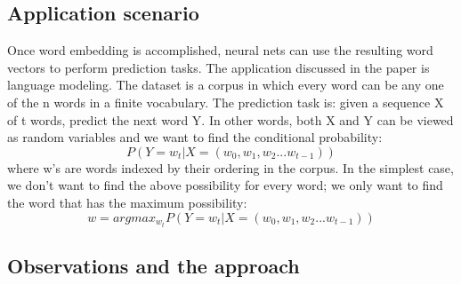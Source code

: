 \documentclass{article}
\begin{document}
\subsection{Application scenario}

Once word embedding is accomplished, neural nets can use the resulting word vectors to perform prediction tasks. The application discussed in the paper is language modeling. The dataset is a corpus in which every word can be any one of the n words in a finite vocabulary. The prediction task is: given a sequence X of t words, predict the next word Y. In other words, both X and Y can be viewed as random variables and we want to find the conditional probability:
\begin{equation}
P(Y = w_t|X = (w_0, w_1, w_2 ... w_{t-1}))
\end{equation}
where w's are words indexed by their ordering in the corpus. In the simplest case, we don't want to find the above possibility for every word; we only want to find the word that has the maximum possibility:
\begin{equation}
	w = argmax_{w_t}P(Y = w_t|X = (w_0, w_1, w_2 ... w_{t-1}))
\end{equation}

\subsection{Observations and the approach}
\end{document}
